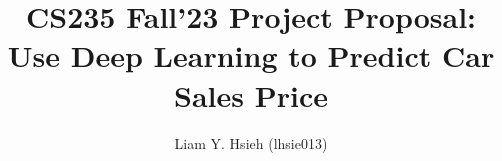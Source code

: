 \documentclass[manuscript,screen,review,nonacm]{acmart}
\begin{document}
\title{CS235 Fall'23 Project Proposal: Use Deep Learning to Predict Car Sales Price}

\author{Liam Y. Hsieh (lhsie013)}
\authorsaddresses{}






\end{document}
